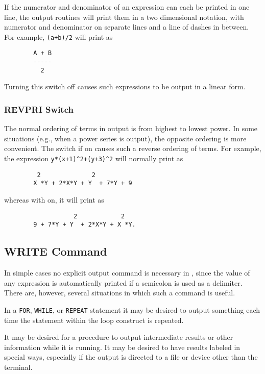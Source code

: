 If the numerator and denominator of an expression can each be printed in
one line, the output routines will print them in a two dimensional
notation, with numerator and denominator on separate lines and a line of
dashes in between. For example, \texttt{(a+b)/2} will print as
\begin{verbatim}
        A + B
        -----
          2
\end{verbatim}
Turning this switch off causes such expressions to be output in a linear
form.

\subsubsection{REVPRI Switch}
\hypertarget{switch:REVPRI}{}

The normal ordering of terms in output is from highest to lowest power.
In some situations (e.g., when a power series is output), the opposite
ordering is more convenient.  The switch  if on causes such a
reverse ordering of terms.  For example, the expression
\texttt{y*(x+1)\textasciicircum2+(y+3)\textasciicircum2} will normally print as
\begin{verbatim}
         2              2
        X *Y + 2*X*Y + Y  + 7*Y + 9
\end{verbatim}
whereas with  on, it will print as
\begin{verbatim}
                   2            2
        9 + 7*Y + Y  + 2*X*Y + X *Y.
\end{verbatim}

\hypertarget{command:WRITE}{\subsection{WRITE Command}}

In simple cases no explicit output command is necessary in
{\REDUCE}, since the value of any expression is automatically printed if a
semicolon is used as a delimiter.  There are, however, several situations
in which such a command is useful.

In a \texttt{FOR}, \texttt{WHILE}, or \texttt{REPEAT} statement it may be desired
to output something each time the statement within the loop construct is
repeated.

It may be desired for a procedure to output intermediate results or other
information while it is running. It may be desired to have results labeled
in special ways, especially if the output is directed to a file or device
other than the terminal.

